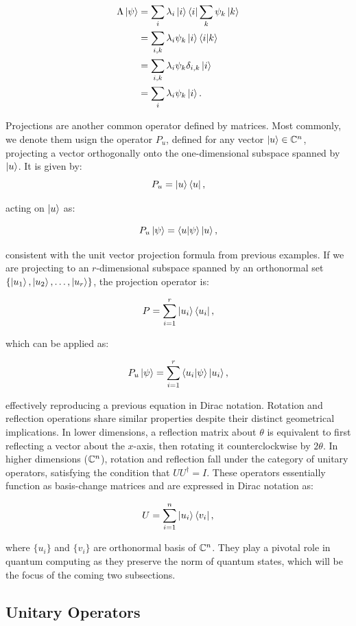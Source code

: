 \documentclass[12pt]{article}
\begin{document}
\begin{align*}
    \Lambda \ket{\psi} &= \sum_{i} \lambda_i \ket{i} \bra{i} \sum_{k} \psi_k \ket{k} \\
    &= \sum_{i, k} \lambda_i \psi_k \ket{i} \braket{i}{k} \\
    &= \sum_{i, k} \lambda_i \psi_k \delta_{i, k} \ket{i} \\
    &= \sum_{i} \lambda_i \psi_k \ket{i}. \\
\end{align*}

Projections are another common operator defined by matrices. Most commonly, we denote them usign the operator $P_u$, defined for any vector $\ket{u} \in \mathbb{C}^n$, projecting a vector orthogonally onto the one-dimensional subspace spanned by $\ket{u}$. It is given by:
\[
P_u = \ket{u} \bra{u},
\]

acting on $\ket{u}$ as:

\[
P_u \ket{\psi} = \braket{u}{\psi} \ket{u},
\]

consistent with the unit vector projection formula from previous examples. If we are projecting to an $r$-dimensional subspace spanned by an orthonormal set $\{\ket{u_1}, \ket{u_2}, \ldots, \ket{u_r}\}$, the projection operator is:

\[
P = \sum_{i=1}^{r} \ket{u_i} \bra{u_i},
\]

which can be applied as:

\[
P_u \ket{\psi} = \sum_{i=1}^{r} \braket{u_i}{\psi} \ket{u_i},
\]

effectively reproducing a previous equation in Dirac notation. Rotation and reflection operations share similar properties despite their distinct geometrical implications. In lower dimensions, a reflection matrix about $\theta$ is equivalent to first reflecting a vector about the $x$-axis, then rotating it counterclockwise by $2\theta$. In higher dimensions ($\mathbb{C}^n$), rotation and reflection fall under the category of unitary operators, satisfying the condition that $UU^\dagger = I$. These operators essentially function as basis-change matrices and are expressed in Dirac notation as:

\[
U = \sum_{i=1}^{n} \ket{u_i} \bra{v_i},
\]

where $\{u_i\}$ and $\{v_i\}$ are orthonormal basis of $\mathbb{C}^n$. They play a pivotal role in quantum computing as they preserve the norm of quantum states, which will be the focus of the coming two subsections. 

\subsection{Unitary Operators}
\end{document}
